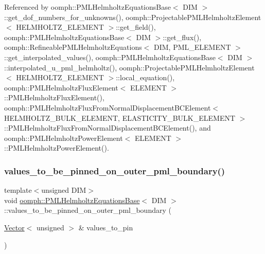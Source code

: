Referenced by oomph\+::\+P\+M\+L\+Helmholtz\+Equations\+Base$<$ D\+I\+M $>$\+::get\+\_\+dof\+\_\+numbers\+\_\+for\+\_\+unknowns(), oomph\+::\+Projectable\+P\+M\+L\+Helmholtz\+Element$<$ H\+E\+L\+M\+H\+O\+L\+T\+Z\+\_\+\+E\+L\+E\+M\+E\+N\+T $>$\+::get\+\_\+field(), oomph\+::\+P\+M\+L\+Helmholtz\+Equations\+Base$<$ D\+I\+M $>$\+::get\+\_\+flux(), oomph\+::\+Refineable\+P\+M\+L\+Helmholtz\+Equations$<$ D\+I\+M, P\+M\+L\+\_\+\+E\+L\+E\+M\+E\+N\+T $>$\+::get\+\_\+interpolated\+\_\+values(), oomph\+::\+P\+M\+L\+Helmholtz\+Equations\+Base$<$ D\+I\+M $>$\+::interpolated\+\_\+u\+\_\+pml\+\_\+helmholtz(), oomph\+::\+Projectable\+P\+M\+L\+Helmholtz\+Element$<$ H\+E\+L\+M\+H\+O\+L\+T\+Z\+\_\+\+E\+L\+E\+M\+E\+N\+T $>$\+::local\+\_\+equation(), oomph\+::\+P\+M\+L\+Helmholtz\+Flux\+Element$<$ E\+L\+E\+M\+E\+N\+T $>$\+::\+P\+M\+L\+Helmholtz\+Flux\+Element(), oomph\+::\+P\+M\+L\+Helmholtz\+Flux\+From\+Normal\+Displacement\+B\+C\+Element$<$ H\+E\+L\+M\+H\+O\+L\+T\+Z\+\_\+\+B\+U\+L\+K\+\_\+\+E\+L\+E\+M\+E\+N\+T, E\+L\+A\+S\+T\+I\+C\+I\+T\+Y\+\_\+\+B\+U\+L\+K\+\_\+\+E\+L\+E\+M\+E\+N\+T $>$\+::\+P\+M\+L\+Helmholtz\+Flux\+From\+Normal\+Displacement\+B\+C\+Element(), and oomph\+::\+P\+M\+L\+Helmholtz\+Power\+Element$<$ E\+L\+E\+M\+E\+N\+T $>$\+::\+P\+M\+L\+Helmholtz\+Power\+Element().

\mbox{\label{classoomph_1_1PMLHelmholtzEquationsBase_a5fc803f8c95512606666a7fe0dbb6f85}} 
\subsubsection{\texorpdfstring{values\+\_\+to\+\_\+be\+\_\+pinned\+\_\+on\+\_\+outer\+\_\+pml\+\_\+boundary()}{values\_to\_be\_pinned\_on\_outer\_pml\_boundary()}}
{\footnotesize\ttfamily template$<$unsigned D\+IM$>$ \\
void \hyperlink{classoomph_1_1PMLHelmholtzEquationsBase}{oomph\+::\+P\+M\+L\+Helmholtz\+Equations\+Base}$<$ D\+IM $>$\+::values\+\_\+to\+\_\+be\+\_\+pinned\+\_\+on\+\_\+outer\+\_\+pml\+\_\+boundary (\begin{DoxyParamCaption}\item[{\hyperlink{classoomph_1_1Vector}{Vector}$<$ unsigned $>$ \&}]{values\+\_\+to\+\_\+pin }\end{DoxyParamCaption})\hspace{0.3cm}{\ttfamily [inline]}}



